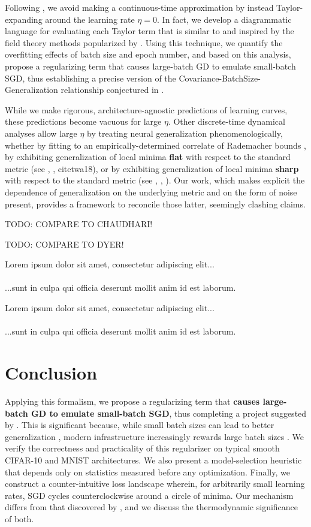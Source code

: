 \documentclass{article}
\newcommand{\lorem}[1]{
    Lorem ipsum dolor sit amet, consectetur adipiscing elit...\\
    \nopagebreak\vspace{#1cm} \ \\
    ...sunt in culpa qui officia deserunt mollit anim id est laborum.
}
\begin{document}
    Following \citet{ro18}, we avoid making a continuous-time approximation by
    instead Taylor-expanding around the learning rate $\eta=0$.  In fact, we
    develop a diagrammatic language for evaluating each Taylor term that is
    similar to and inspired by the field theory methods popularized by
    \citet{dy49a}.  Using this technique, we quantify the overfitting effects
    of batch size and epoch number, and based on this analysis, propose a
    regularizing term that causes large-batch GD to emulate small-batch SGD,
    thus establishing a precise version of the
    Covariance-BatchSize-Generalization relationship conjectured in
    \citet{ja18}.  
    
    While we make rigorous, architecture-agnostic predictions of learning
    curves, these predictions become vacuous for large $\eta$.  Other
    discrete-time dynamical analyses allow large $\eta$ by treating neural
    generalization phenomenologically, whether by fitting to an
    empirically-determined correlate of Rademacher bounds \citep{li18}, by
    exhibiting generalization of local minima {\bf flat} with respect to the
    standard metric (see \citet{ho17}, \citet{ke17}, citet{wa18}), or by
    exhibiting generalization of local minima {\bf sharp} with respect to the
    standard metric (see \citet{st56}, \citet{di17}, \citet{wu18}).  Our work,
    which makes explicit the dependence of generalization on the underlying
    metric and on the form of noise present, provides a framework to reconcile
    those latter, seemingly clashing claims.
    
    {\color{red} TODO: COMPARE TO CHAUDHARI!}
    
    {\color{red} TODO: COMPARE TO DYER!}

    \lorem{3}
    \lorem{3}

\section{Conclusion}

    Applying this formalism, we propose a regularizing term that {\bf causes
    large-batch GD to emulate small-batch SGD}, thus completing a project
    suggested by \citet{ro18}.  This is significant because, while small batch
    sizes can lead to better generalization \citep{bo91}, modern infrastructure
    increasingly rewards large batch sizes \citep{go18}.  We verify the
    correctness and practicality of this regularizer on typical smooth CIFAR-10
    and MNIST architectures.  We also present a model-selection heuristic that
    depends only on statistics measured before any optimization.  Finally, we
    construct a counter-intuitive loss landscape wherein, for arbitrarily small
    learning rates, SGD cycles counterclockwise around a circle of minima.  Our
    mechanism differs from that discovered by \citet{ch18}, and we discuss the
    thermodynamic significance of both.
\end{document}

